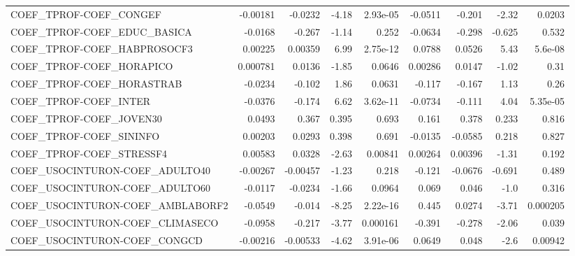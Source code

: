 \begin{tabular}{lrrrrrrrr}
COEF\_TPROF-COEF\_CONGEF                 &    -0.00181 &      -0.0232 &    -4.18 & 2.93e-05 &    -0.0511 &      -0.201 &        -2.32 &        0.0203 \\
COEF\_TPROF-COEF\_EDUC\_BASICA            &     -0.0168 &       -0.267 &    -1.14 &    0.252 &    -0.0634 &      -0.298 &       -0.625 &         0.532 \\
COEF\_TPROF-COEF\_HABPROSOCF3            &     0.00225 &      0.00359 &     6.99 & 2.75e-12 &     0.0788 &      0.0526 &         5.43 &       5.6e-08 \\
COEF\_TPROF-COEF\_HORAPICO               &    0.000781 &       0.0136 &    -1.85 &   0.0646 &    0.00286 &      0.0147 &        -1.02 &          0.31 \\
COEF\_TPROF-COEF\_HORASTRAB              &     -0.0234 &       -0.102 &     1.86 &   0.0631 &     -0.117 &      -0.167 &         1.13 &          0.26 \\
COEF\_TPROF-COEF\_INTER                  &     -0.0376 &       -0.174 &     6.62 & 3.62e-11 &    -0.0734 &      -0.111 &         4.04 &      5.35e-05 \\
COEF\_TPROF-COEF\_JOVEN30                &      0.0493 &        0.367 &    0.395 &    0.693 &      0.161 &       0.378 &        0.233 &         0.816 \\
COEF\_TPROF-COEF\_SININFO                &     0.00203 &       0.0293 &    0.398 &    0.691 &    -0.0135 &     -0.0585 &        0.218 &         0.827 \\
COEF\_TPROF-COEF\_STRESSF4               &     0.00583 &       0.0328 &    -2.63 &  0.00841 &    0.00264 &     0.00396 &        -1.31 &         0.192 \\
COEF\_USOCINTURON-COEF\_ADULTO40         &    -0.00267 &     -0.00457 &    -1.23 &    0.218 &     -0.121 &     -0.0676 &       -0.691 &         0.489 \\
COEF\_USOCINTURON-COEF\_ADULTO60         &     -0.0117 &      -0.0234 &    -1.66 &   0.0964 &      0.069 &       0.046 &         -1.0 &         0.316 \\
COEF\_USOCINTURON-COEF\_AMBLABORF2       &     -0.0549 &       -0.014 &    -8.25 & 2.22e-16 &      0.445 &      0.0274 &        -3.71 &      0.000205 \\
COEF\_USOCINTURON-COEF\_CLIMASECO        &     -0.0958 &       -0.217 &    -3.77 & 0.000161 &     -0.391 &      -0.278 &        -2.06 &         0.039 \\
COEF\_USOCINTURON-COEF\_CONGCD           &    -0.00216 &     -0.00533 &    -4.62 & 3.91e-06 &     0.0649 &       0.048 &         -2.6 &       0.00942 \\

\end{tabular}
